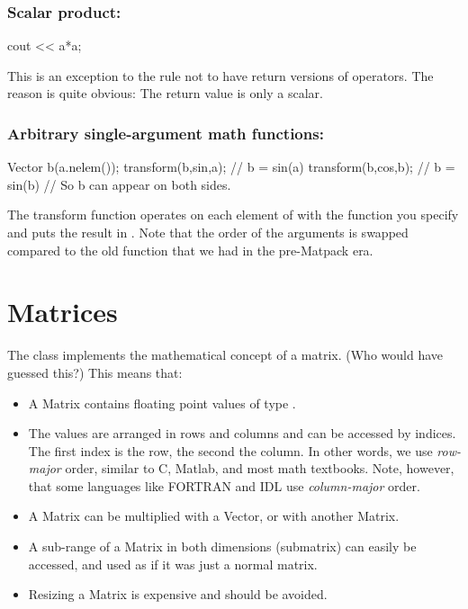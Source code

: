 \subsubsection{Scalar product:}
\begin{code}
cout << a*a;
\end{code}

This is an exception to the rule not to have return versions of
operators. The reason is quite obvious: The return value is only a
scalar. 

\subsubsection{Arbitrary single-argument math functions:}
\begin{code}
Vector b(a.nelem());
transform(b,sin,a);  // b = sin(a)
transform(b,cos,b);  // b = sin(b)
                     // So b can appear on both sides.
\end{code}

The transform function operates on each element of  with the
function you specify and puts the result in . Note that the
order of the arguments is swapped compared to the old function
 that we had in the pre-Matpack era.


\section{Matrices}
\label{sec:matpack:matrices}

The class  implements the mathematical concept of a
matrix. (Who would have guessed this?) This means that:
\begin{itemize}
\item A Matrix contains floating point values of type .
\item The values are arranged in rows and columns and can be accessed
  by indices. The first index is the row, the second the column. In
  other words, we use \emph{row-major} order, similar to C, Matlab,
  and most math textbooks. Note, however, that some languages like
  FORTRAN and IDL use \emph{column-major} order.
\item A Matrix can be multiplied with a Vector, or with another
  Matrix.
\item A sub-range of a Matrix in both dimensions (submatrix) can
  easily be accessed, and used as if it was just a normal matrix.
\item Resizing a Matrix is expensive and should be avoided.
\end{itemize}

